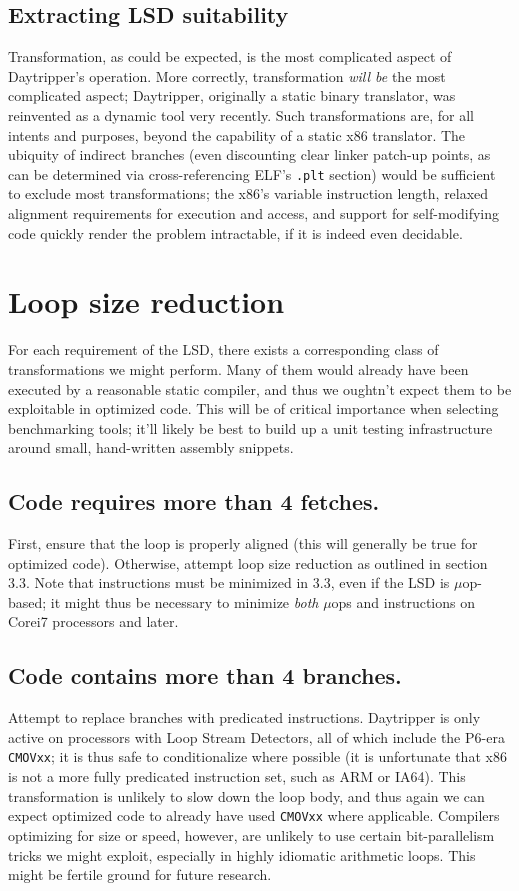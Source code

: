 \documentclass[]{sigplanconf}
\begin{document}
\subsection{Extracting LSD suitability}
Transformation, as could be expected, is the most complicated aspect of
Daytripper's operation. More correctly, transformation \textit{will be} the
most complicated aspect; Daytripper, originally a static binary translator,
was reinvented as a dynamic tool very recently. Such transformations are, for
all intents and purposes, beyond the capability of a static x86 translator.
The ubiquity of indirect branches (even discounting clear linker patch-up points,
as can be determined via cross-referencing ELF's \texttt{.plt} section) would
be sufficient to exclude most transformations\cite{landi}; the x86's variable
instruction length, relaxed alignment requirements for execution and access,
and support for self-modifying code quickly render the problem intractable,
if it is indeed even decidable.

\section{Loop size reduction}

For each requirement of the LSD, there exists a corresponding class of
transformations we might perform. Many of them would already have been
executed by a reasonable static compiler, and thus we oughtn't expect them
to be exploitable in optimized code. This will be of critical importance
when selecting benchmarking tools; it'll likely be best to build up a unit
testing infrastructure around small, hand-written assembly snippets.

\subsection{Code requires more than 4 fetches.} First, ensure that the loop is
properly aligned (this will generally be true for optimized code). Otherwise,
attempt loop size reduction as outlined in section 3.3. Note that instructions
must be minimized in 3.3, even if the LSD is $\mu$op-based; it might thus be
necessary to minimize \textit{both} $\mu$ops and instructions on Core\texttrademark i7
processors and later.

\subsection{Code contains more than 4 branches.} Attempt to replace branches with
predicated instructions. Daytripper is only active on processors with Loop
Stream Detectors, all of which include the P6-era \texttt{CMOVxx}; it is thus
safe to conditionalize where possible (it is unfortunate that x86 is not a more
fully predicated instruction set, such as ARM \cite{seal} or IA64). This transformation is
unlikely to slow down the loop body, and thus again we can expect optimized
code to already have used \texttt{CMOVxx} where applicable. Compilers
optimizing for size or speed, however, are unlikely to use certain
bit-parallelism tricks \cite{warren} we might exploit, especially in highly
idiomatic arithmetic loops. This might be fertile ground for future research.
\end{document}
